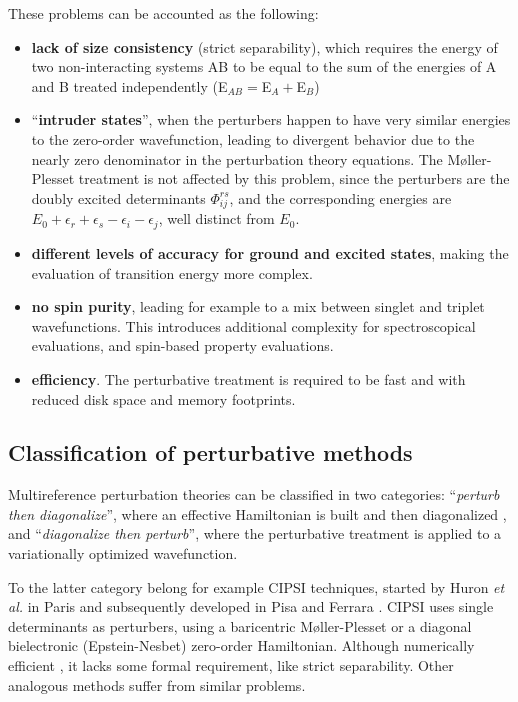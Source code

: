 These problems can be accounted as the following:
\begin{itemize}
\item \textbf{lack of size consistency} (strict separability), which
requires the energy of two non-interacting systems AB to be equal to the sum
of the energies of A and B treated independently (E$_{AB} = $E$_A + $E$_B$)
\item ``\textbf{intruder states}'', when the perturbers happen to have very similar
energies to the zero-order wavefunction, leading to divergent behavior due
to the nearly zero denominator in the perturbation theory equations.
The M{\o}ller-Plesset treatment is not affected by this problem, since the
perturbers are the doubly excited determinants $\Phi_{ij}^{rs}$, and the
corresponding energies are $E_0 + \epsilon_r + \epsilon_s - \epsilon_i -
\epsilon_j$, well distinct from $E_0$.
\item \textbf{different levels of accuracy for ground and excited states}, making the
evaluation of transition energy more complex.
\item \textbf{no spin purity}, leading for example to a mix between singlet and triplet
wavefunctions. This introduces additional complexity for spectroscopical
evaluations, and spin-based property evaluations.
\item \textbf{efficiency}. The perturbative treatment is required to be fast and with
reduced disk space and memory footprints.
\end{itemize}

\subsection*{Classification of perturbative methods}

Multireference perturbation theories can be classified in two categories:
``\textit{perturb then diagonalize}'', where an effective Hamiltonian is built
and then diagonalized \cite{rmp-39-771-1967,jpa-18-809-1985}, and
``\textit{diagonalize then perturb}'', where the perturbative treatment is
applied to a variationally optimized wavefunction. 

To the latter category belong for example CIPSI techniques, started by
Huron \textit{et al.}\cite{jcp-58-5745-1973} in Paris and subsequently
developed in Pisa\cite{jcc-8-39-1987} and Ferrara
\cite{ijqc-60-167-1996,tca-98-57-1997,tca-98-117-1997,tca-105-259-2001}.
CIPSI uses single determinants as perturbers, using a baricentric
M{\o}ller-Plesset or a diagonal bielectronic
(Epstein-Nesbet\cite{pr-28-695-1926,prsl-230-312-1955}) zero-order
Hamiltonian. Although numerically efficient
\cite{ijqc-60-167-1996,tca-98-57-1997,tca-98-117-1997,jcp-83-1746-1985}, it lacks some formal
requirement, like strict separability. Other analogous methods
\cite{jcp-90-3647-1997,cpl-190-374-1992,jcp-94-5021-1991,cpl-183-443-1991, cpl-222-615-1994}
suffer from similar problems.

